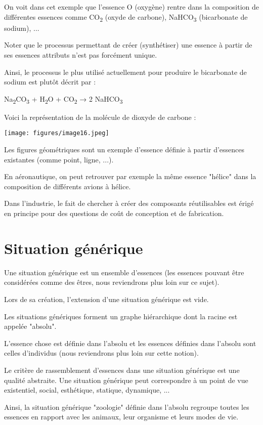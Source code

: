 \documentclass[a4paper, 12pt, openright, french]{book}
\begin{document}
On voit dans cet exemple que l'essence O (oxygène)
rentre dans la composition de différentes essences comme
CO\textsubscript{2} (oxyde de carbone), NaHCO\textsubscript{3}
(bicarbonate de sodium), ...

Noter que le processus permettant de créer (synthétiser) une essence à
partir de ses essences attributs n'est pas forcément
unique.

Ainsi, le processus le plus utilisé actuellement pour produire le
bicarbonate de sodium est plutôt décrit par :

Na\textsubscript{2}CO\textsubscript{3} + H\textsubscript{2}O +
CO\textsubscript{2} → 2 NaHCO\textsubscript{3}

Voici la représentation de la molécule de dioxyde de carbone :

\texttt{[image: figures/image16.jpeg]}

Les figures géométriques sont un exemple d'essence
définie à partir d'essences existantes (comme point,
ligne, ...).

En aéronautique, on peut retrouver par exemple la même essence "hélice"
dans la composition de différents avions à hélice.

Dans l'industrie, le fait de chercher à créer des
composants réutilisables est érigé en principe pour des questions de
coût de conception et de fabrication.

\newpage
\raggedbottom
\section{Situation générique}

Une situation générique est un ensemble d'essences (les
essences pouvant être considérées comme des êtres, nous reviendrons plus
loin sur ce sujet).

Lors de sa création, l'extension d'une
situation générique est vide.

Les situations génériques forment un graphe hiérarchique dont la racine
est appelée "absolu".

L'essence chose est définie dans
l'absolu et les essences définies dans
l'absolu sont celles d'individus (nous reviendrons plus loin sur cette notion).

Le critère de rassemblement d'essences dans une
situation générique est une qualité abstraite. Une situation générique
peut correspondre à un point de vue existentiel, social, esthétique,
statique, dynamique, ...

Ainsi, la situation générique "zoologie" définie dans
l'absolu regroupe toutes les essences en rapport avec
les animaux, leur organisme et leurs modes de vie.
\end{document}

